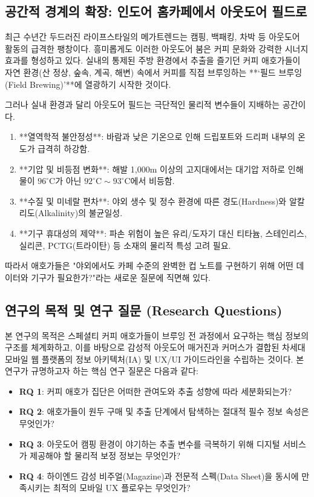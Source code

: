 \documentclass[10pt,a4paper]{article}
\begin{document}
\subsection{공간적 경계의 확장: 인도어 홈카페에서 아웃도어 필드로}
최근 수년간 두드러진 라이프스타일의 메가트렌드는 캠핑, 백패킹, 차박 등 아웃도어 활동의 급격한 팽창이다. 흥미롭게도 이러한 아웃도어 붐은 커피 문화와 강력한 시너지 효과를 형성하고 있다. 실내의 통제된 주방 환경에서 추출을 즐기던 커피 애호가들이 자연 환경(산 정상, 숲속, 계곡, 해변) 속에서 커피를 직접 브루잉하는 **‘필드 브루잉(Field Brewing)’**에 열광하기 시작한 것이다.

그러나 실내 환경과 달리 아웃도어 필드는 극단적인 물리적 변수들이 지배하는 공간이다.
\begin{enumerate}[itemsep=2pt,topsep=2pt]
    \item **열역학적 불안정성**: 바람과 낮은 기온으로 인해 드립포트와 드리퍼 내부의 온도가 급격히 하강함.
    \item **기압 및 비등점 변화**: 해발 1,000m 이상의 고지대에서는 대기압 저하로 인해 물이 $96^\circ\text{C}$가 아닌 $92^\circ\text{C}\sim 93^\circ\text{C}$에서 비등함.
    \item **수질 및 미네랄 편차**: 야외 생수 및 정수 환경에 따른 경도(Hardness)와 알칼리도(Alkalinity)의 불균일성.
    \item **기구 휴대성의 제약**: 파손 위험이 높은 유리/도자기 대신 티타늄, 스테인리스, 실리콘, PCTG(트라이탄) 등 소재의 물리적 특성 고려 필요.
\end{enumerate}
따라서 애호가들은 "야외에서도 카페 수준의 완벽한 컵 노트를 구현하기 위해 어떤 데이터와 기구가 필요한가?"라는 새로운 질문에 직면해 있다.

\subsection{연구의 목적 및 연구 질문 (Research Questions)}
본 연구의 목적은 스페셜티 커피 애호가들이 브루잉 전 과정에서 요구하는 핵심 정보의 구조를 체계화하고, 이를 바탕으로 감성적 아웃도어 매거진과 커머스가 결합된 차세대 모바일 웹 플랫폼의 정보 아키텍처(IA) 및 UX/UI 가이드라인을 수립하는 것이다. 본 연구가 규명하고자 하는 핵심 연구 질문은 다음과 같다:
\begin{itemize}[itemsep=2pt,topsep=2pt]
    \item \textbf{RQ 1}: 커피 애호가 집단은 어떠한 관여도와 추출 성향에 따라 세분화되는가?
    \item \textbf{RQ 2}: 애호가들이 원두 구매 및 추출 단계에서 탐색하는 절대적 필수 정보 속성은 무엇인가?
    \item \textbf{RQ 3}: 아웃도어 캠핑 환경이 야기하는 추출 변수를 극복하기 위해 디지털 서비스가 제공해야 할 물리적 보정 정보는 무엇인가?
    \item \textbf{RQ 4}: 하이엔드 감성 비주얼(Magazine)과 전문적 스펙(Data Sheet)을 동시에 만족시키는 최적의 모바일 UX 플로우는 무엇인가?
\end{itemize}
\end{document}
